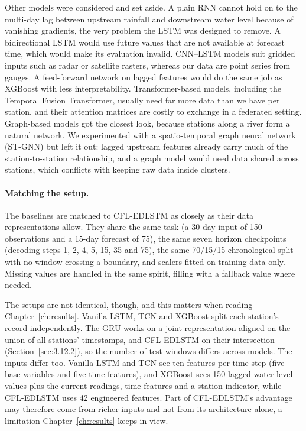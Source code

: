Other models were considered and set aside. A plain RNN cannot hold on to the
multi-day lag between upstream rainfall and downstream water level because of
vanishing gradients, the very problem the LSTM was designed to remove. A
bidirectional LSTM would use future values that are not available at forecast
time, which would make its evaluation invalid. CNN--LSTM models suit gridded
inputs such as radar or satellite rasters, whereas our data are point series
from gauges. A feed-forward network on lagged features would do the same job as
XGBoost with less interpretability. Transformer-based models, including the
Temporal Fusion Transformer, usually need far more data than we have per
station, and their attention matrices are costly to exchange in a federated
setting. Graph-based models got the closest look, because stations along a river
form a natural network. We experimented with a spatio-temporal graph neural
network (ST-GNN) but left it out: lagged upstream features already carry much of
the station-to-station relationship, and a graph model would need data shared
across stations, which conflicts with keeping raw data inside clusters.

\paragraph{Matching the setup.}
The baselines are matched to CFL-EDLSTM as closely as their data
representations allow. They share the same task (a 30-day input of 150
observations and a 15-day forecast of 75), the same seven horizon checkpoints
(decoding steps 1, 2, 4, 5, 15, 35 and 75), the same 70/15/15 chronological
split with no window crossing a boundary, and scalers fitted on training data
only. Missing values are handled in the same spirit, filling with a fallback
value where needed.

The setups are not identical, though, and this matters when reading
Chapter~\ref{ch:results}. Vanilla LSTM, TCN and XGBoost split each station's
record independently. The GRU works on a joint representation aligned on the
union of all stations' timestamps, and CFL-EDLSTM on their intersection
(Section~\ref{sec:3.12.2}), so the number of test windows differs across models.
The inputs differ too. Vanilla LSTM and TCN see ten features per time step (five
base variables and five time features), and XGBoost sees 150 lagged water-level
values plus the current readings, time features and a station indicator, while
CFL-EDLSTM uses 42 engineered features. Part of CFL-EDLSTM's advantage may
therefore come from richer inputs and not from its architecture alone, a
limitation Chapter~\ref{ch:results} keeps in view.

